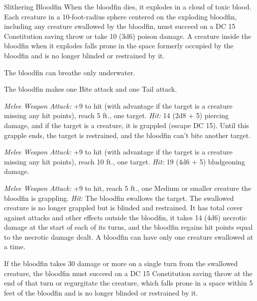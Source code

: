 \documentclass[10pt,a4paper,twoside,twocolumn,openany,nodeprecatedcode]{dndbook}
\begin{document}
\begin{DndMonster}[float=ht]{Slithering Bloodfin}
\DndMonsterBasics[
armor-class = {16 (natural armor)},
hit-points = {\DndDice{11d10 + 33}},
speed = {5 ft., 50 ft. (key)}
]
\DndMonsterAbilityScores[
 str = 20,
 dex = 14,
 con = 16,
 int = 2,
 wis = 10,
 cha = 3
]
\DndMonsterDetails[
skills = {Perception +4},
damage-immunities = {poison},
senses = {blindsight 100 ft. (blind beyond this radius), passive perception 14},
challenge = 9,
]
When the bloodfin dies, it explodes in a cloud of toxic blood. Each creature in a 10-foot-radius sphere centered on the exploding bloodfin, including any creature swallowed by the bloodfin, must succeed on a DC 15 Constitution saving throw or take 10 (3d6) poison damage. A creature inside the bloodfin when it explodes falls prone in the space formerly occupied by the bloodfin and is no longer blinded or restrained by it.

The bloodfin can breathe only underwater.

\par
{}
The bloodfin makes one Bite attack and one Tail attack.

\textsl{Melee Weapon Attack:} +9 to hit (with advantage if the target is a creature missing any hit points), reach 5 ft., one target. \textsl{Hit:} 14 (2d8 + 5) piercing damage, and if the target is a creature, it is grappled (escape DC 15). Until this grapple ends, the target is restrained, and the bloodfin can't bite another target.

\textsl{Melee Weapon Attack:} +9 to hit (with advantage if the target is a creature missing any hit points), reach 10 ft., one target. \textsl{Hit:} 19 (4d6 + 5) bludgeoning damage.

\par
{}
\textsl{Melee Weapon Attack:} +9 to hit, reach 5 ft., one Medium or smaller creature the bloodfin is grappling. \textsl{Hit:} The bloodfin swallows the target. The swallowed creature is no longer grappled but is blinded and restrained. It has total cover against attacks and other effects outside the bloodfin, it takes 14 (4d6) necrotic damage at the start of each of its turns, and the bloodfin regains hit points equal to the necrotic damage dealt. A bloodfin can have only one creature swallowed at a time.

If the bloodfin takes 30 damage or more on a single turn from the swallowed creature, the bloodfin must succeed on a DC 15 Constitution saving throw at the end of that turn or regurgitate the creature, which falls prone in a space within 5 feet of the bloodfin and is no longer blinded or restrained by it.

\end{DndMonster}
\end{document}
